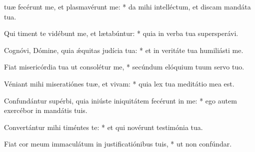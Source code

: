 \begin{psalmus}

 tuæ fecérunt me, et plasmavérunt me: * da mihi intelléctum, et discam mandáta tua.

Qui timent te vidébunt me, et lætabúntur: * quia in verba tua supersperávi.

Cognóvi, Dómine, quia ǽquitas judícia tua: * et in veritáte tua humiliásti me.

Fiat misericórdia tua ut consolétur me, * secúndum elóquium tuum servo tuo.

Véniant mihi miseratiónes tuæ, et vivam: * quia lex tua meditátio mea est.

Confundántur supérbi, quia iniúste iniquitátem fecérunt in me: * ego autem exercébor in mandátis tuis.

Convertántur mihi timéntes te: * et qui novérunt testimónia tua.

Fiat cor meum immaculátum in justificatiónibus tuis, * ut non confúndar.

\end{psalmus}
